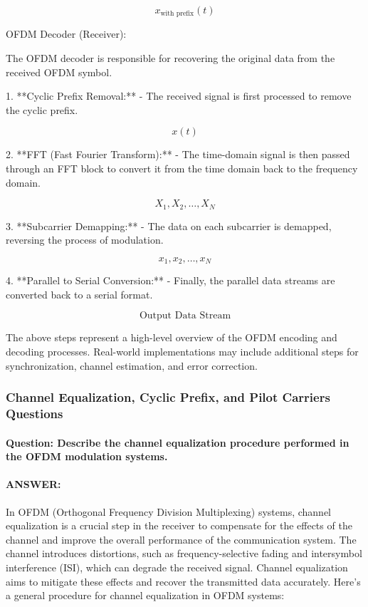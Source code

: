 \documentclass[colorlinks,11pt,a4paper,normalphoto,withhyper,ragged2e]{altareport}
\begin{document}
				\[ x_{\text{with prefix}}(t) \]
				
				OFDM Decoder (Receiver):
				
				The OFDM decoder is responsible for recovering the original data from the received OFDM symbol.
				
				1. **Cyclic Prefix Removal:**
				- The received signal is first processed to remove the cyclic prefix.
				
				\[ x(t) \]
				
				2. **FFT (Fast Fourier Transform):**
				- The time-domain signal is then passed through an FFT block to convert it from the time domain back to the frequency domain.
				
				\[ X_1, X_2, \ldots, X_N \]
				
				3. **Subcarrier Demapping:**
				- The data on each subcarrier is demapped, reversing the process of modulation.
				
				\[ x_1, x_2, \ldots, x_N \]
				
				4. **Parallel to Serial Conversion:**
				- Finally, the parallel data streams are converted back to a serial format.
				
				\[ \text{Output Data Stream} \]
				
				The above steps represent a high-level overview of the OFDM encoding and decoding processes. Real-world implementations may include additional steps for synchronization, channel estimation, and error correction.
				
				
				
				
				
			\subsubsection{Channel Equalization, Cyclic Prefix, and Pilot Carriers Questions}
				\paragraph{Question: Describe the channel equalization procedure performed in the OFDM modulation systems.}
				\paragraph{ANSWER:}
				
				In OFDM (Orthogonal Frequency Division Multiplexing) systems, channel equalization is a crucial step in the receiver to compensate for the effects of the channel and improve the overall performance of the communication system. The channel introduces distortions, such as frequency-selective fading and intersymbol interference (ISI), which can degrade the received signal. Channel equalization aims to mitigate these effects and recover the transmitted data accurately. Here's a general procedure for channel equalization in OFDM systems:
				
\end{document}
